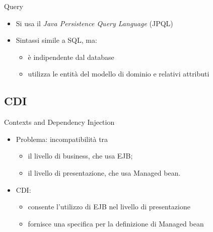 \begin{frame}{Query}

\begin{itemize}
\item Si usa il \textsl{Java Persistence Query Language} (JPQL)

\item Sintassi simile a SQL, ma:

	\begin{itemize}
	\item è indipendente dal database
	\item utilizza le entità del modello di dominio e relativi attributi
	\end{itemize}


\end{itemize}

\end{frame}


\subsection{CDI}

\begin{frame}{Contexts and Dependency Injection}

\begin{itemize}
\item Problema: incompatibilità tra
	\begin{itemize}
	\item il livello di business, che usa EJB;
	\item il livello di presentazione, che usa Managed bean.
	\end{itemize}
	
\item CDI:
	\begin{itemize}
	\item consente l'utilizzo di EJB nel livello di presentazione
	\item fornisce una specifica per la definizione di Managed bean
	\end{itemize}
\end{itemize}

\end{frame}




